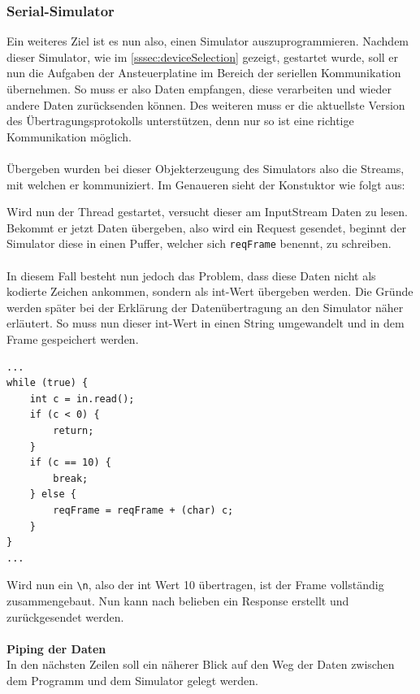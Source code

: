 \subsubsection{Serial-Simulator}\label{sssec:serialSim}
Ein weiteres Ziel ist es nun also, einen Simulator auszuprogrammieren.
Nachdem dieser Simulator, wie im \autoref{sssec:deviceSelection} gezeigt, gestartet wurde, soll er nun die Aufgaben der Ansteuerplatine im Bereich der seriellen Kommunikation übernehmen.
So muss er also Daten empfangen, diese verarbeiten und wieder andere Daten zurücksenden können.
Des weiteren muss er die aktuellste Version des Übertragungsprotokolls unterstützen, denn nur so ist eine richtige Kommunikation möglich.\\\\
Übergeben wurden bei dieser Objekterzeugung des Simulators also die Streams, mit welchen er kommuniziert.
Im Genaueren sieht der Konstuktor wie folgt aus:

Wird nun der Thread gestartet, versucht dieser am InputStream Daten zu lesen.
Bekommt er jetzt Daten übergeben, also wird ein Request gesendet, beginnt der Simulator diese in einen Puffer, welcher sich \lstinline[style=java]{reqFrame} benennt, zu schreiben.\\\\
In diesem Fall besteht nun jedoch das Problem, dass diese Daten nicht als kodierte Zeichen ankommen, sondern als int-Wert übergeben werden.
Die Gründe werden später bei der Erklärung der Datenübertragung an den Simulator näher erläutert.
So muss nun dieser int-Wert in einen String umgewandelt und in dem Frame gespeichert werden.
\begin{lstlisting}[style=java,caption=Teilabschnitt Methode run(),label=stringParse]
...
while (true) {
    int c = in.read();
    if (c < 0) {
        return;
    }
    if (c == 10) {
        break;
    } else {
        reqFrame = reqFrame + (char) c;
    }
}
...
\end{lstlisting}
Wird nun ein \verb!\n!, also der int Wert 10 übertragen, ist der Frame vollständig zusammengebaut.
Nun kann nach belieben ein Response erstellt und zurückgesendet werden.\\\\
\textbf{Piping der Daten}\\
In den nächsten Zeilen soll ein näherer Blick auf den Weg der Daten zwischen dem Programm und dem Simulator gelegt werden.\\
